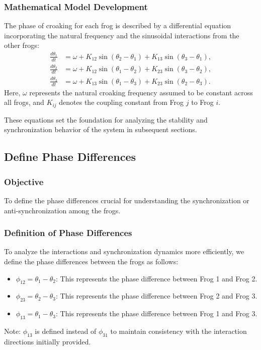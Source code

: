 \documentclass[12pt,a4paper]{article}
\begin{document}
\subsubsection{Mathematical Model Development}
The phase of croaking for each frog is described by a differential equation incorporating the natural frequency and the sinusoidal interactions from the other frogs:
\begin{align}
\frac{d\theta_1}{dt} &= \omega + K_{12} \sin(\theta_2 - \theta_1) + K_{13} \sin(\theta_3 - \theta_1), \\
\frac{d\theta_2}{dt} &= \omega + K_{12} \sin(\theta_1 - \theta_2) + K_{23} \sin(\theta_3 - \theta_2), \\
\frac{d\theta_3}{dt} &= \omega + K_{13} \sin(\theta_1 - \theta_3) + K_{23} \sin(\theta_2 - \theta_3).
\end{align}
Here, $\omega$ represents the natural croaking frequency assumed to be constant across all frogs, and $K_{ij}$ denotes the coupling constant from Frog $j$ to Frog $i$.

These equations set the foundation for analyzing the stability and synchronization behavior of the system in subsequent sections.

\subsection{Define Phase Differences}

\subsubsection{Objective}
To define the phase differences crucial for understanding the synchronization or anti-synchronization among the frogs.

\subsubsection{Definition of Phase Differences}
To analyze the interactions and synchronization dynamics more efficiently, we define the phase differences between the frogs as follows:
\begin{itemize}
    \item $\phi_{12} = \theta_1 - \theta_2$: This represents the phase difference between Frog 1 and Frog 2.
    \item $\phi_{23} = \theta_2 - \theta_3$: This represents the phase difference between Frog 2 and Frog 3.
    \item $\phi_{13} = \theta_1 - \theta_3$: This represents the phase difference between Frog 1 and Frog 3.
\end{itemize}
Note: $\phi_{13}$ is defined instead of $\phi_{31}$ to maintain consistency with the interaction directions initially provided.
\end{document}
